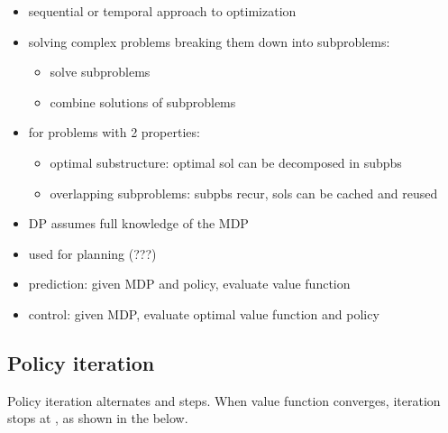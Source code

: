 \documentclass[letterpaper,10pt,english]{jupyterBook}
\begin{document}
\begin{itemize}
\item {} 
\sphinxAtStartPar
sequential or temporal approach to optimization

\item {} 
\sphinxAtStartPar
solving complex problems breaking them down into sub\sphinxhyphen{}problems:
\begin{itemize}
\item {} 
\sphinxAtStartPar
solve sub\sphinxhyphen{}problems

\item {} 
\sphinxAtStartPar
combine solutions of sub\sphinxhyphen{}problems

\end{itemize}

\item {} 
\sphinxAtStartPar
for problems with 2 properties:
\begin{itemize}
\item {} 
\sphinxAtStartPar
optimal substructure: optimal sol can be decomposed in sub\sphinxhyphen{}pbs

\item {} 
\sphinxAtStartPar
overlapping sub\sphinxhyphen{}problems: sub\sphinxhyphen{}pbs recur, sols can be cached and reused

\end{itemize}

\item {} 
\sphinxAtStartPar
DP assumes full knowledge of the MDP

\item {} 
\sphinxAtStartPar
used for planning (???)

\item {} 
\sphinxAtStartPar
prediction: given MDP and policy, evaluate value function

\item {} 
\sphinxAtStartPar
control: given MDP, evaluate optimal value function and policy

\end{itemize}


\subsection{Policy iteration}
\label{\detokenize{ch/rl/mdp_sol_dp_lp:policy-iteration}}\label{\detokenize{ch/rl/mdp_sol_dp_lp:rl-mdp-sol-dp-pi}}
\sphinxAtStartPar
Policy iteration alternates {\hyperref[\detokenize{ch/rl/mdp_sol_dp_lp:rl-mdp-sol-dp-pi-eval}]{}} and {\hyperref[\detokenize{ch/rl/mdp_sol_dp_lp:rl-mdp-sol-dp-pi-impr}]{}} steps. When value function converges, iteration stops at , as shown in the {\hyperref[\detokenize{ch/rl/mdp_sol_dp_lp:rl-mdp-sol-dp-pi-algorithm}]{}} below.
\end{document}

